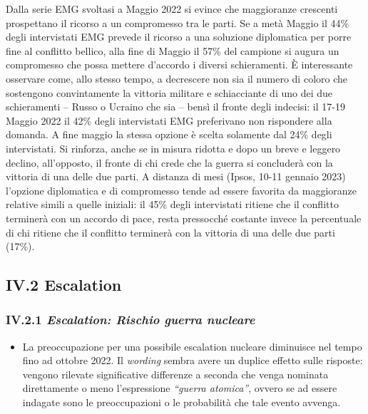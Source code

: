 \documentclass[
  openany]{book}
\providecommand{\tightlist}{%
  \setlength{\itemsep}{0pt}\setlength{\parskip}{0pt}}
\begin{document}
Dalla serie EMG svoltasi a Maggio 2022 si evince che maggioranze crescenti prospettano il ricorso a un compromesso tra le parti. Se a metà Maggio il 44\% degli intervistati EMG prevede il ricorso a una soluzione diplomatica per porre fine al conflitto bellico, alla fine di Maggio il 57\% del campione si augura un compromesso che possa mettere d'accordo i diversi schieramenti. È interessante osservare come, allo stesso tempo, a decrescere non sia il numero di coloro che sostengono convintamente la vittoria militare e schiacciante di uno dei due schieramenti -- Russo o Ucraino che sia -- bensì il fronte degli indecisi: il 17-19 Maggio 2022 il 42\% degli intervistati EMG preferivano non rispondere alla domanda. A fine maggio la stessa opzione è scelta solamente dal 24\% degli intervistati. Si rinforza, anche se in misura ridotta e dopo un breve e leggero declino, all'opposto, il fronte di chi crede che la guerra si concluderà con la vittoria di una delle due parti. A distanza di mesi (Ipsos, 10-11 gennaio 2023) l'opzione diplomatica e di compromesso tende ad essere favorita da maggioranze relative simili a quelle iniziali: il 45\% degli intervistati ritiene che il conflitto terminerà con un accordo di pace, resta pressocché costante invece la percentuale di chi ritiene che il conflitto terminerà con la vittoria di una delle due parti (17\%).

\hypertarget{iv.2-escalation}{%
\subsection{IV.2 Escalation}\label{iv.2-escalation}}

\hypertarget{iv.2.1-escalation-rischio-guerra-nucleare}{%
\subsubsection{\texorpdfstring{IV.2.1 \emph{Escalation: Rischio guerra nucleare}}{IV.2.1 Escalation: Rischio guerra nucleare}}\label{iv.2.1-escalation-rischio-guerra-nucleare}}

\begin{itemize}
\tightlist
\item
  La preoccupazione per una possibile escalation nucleare diminuisce nel tempo fino ad ottobre 2022. Il \emph{wording} sembra avere un duplice effetto sulle risposte: vengono rilevate significative differenze a seconda che venga nominata direttamente o meno l'espressione \emph{``guerra atomica''}, ovvero se ad essere indagate sono le preoccupazioni o le probabilità che tale evento avvenga.
\end{itemize}
\end{document}
